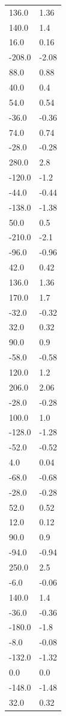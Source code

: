 \begin{longtable}{ll}
136.0 & 1.36 \\
140.0 & 1.4 \\
16.0 & 0.16 \\
-208.0 & -2.08 \\
88.0 & 0.88 \\
40.0 & 0.4 \\
54.0 & 0.54 \\
-36.0 & -0.36 \\
74.0 & 0.74 \\
-28.0 & -0.28 \\
280.0 & 2.8 \\
-120.0 & -1.2 \\
-44.0 & -0.44 \\
-138.0 & -1.38 \\
50.0 & 0.5 \\
-210.0 & -2.1 \\
-96.0 & -0.96 \\
42.0 & 0.42 \\
136.0 & 1.36 \\
170.0 & 1.7 \\
-32.0 & -0.32 \\
32.0 & 0.32 \\
90.0 & 0.9 \\
-58.0 & -0.58 \\
120.0 & 1.2 \\
206.0 & 2.06 \\
-28.0 & -0.28 \\
100.0 & 1.0 \\
-128.0 & -1.28 \\
-52.0 & -0.52 \\
4.0 & 0.04 \\
-68.0 & -0.68 \\
-28.0 & -0.28 \\
52.0 & 0.52 \\
12.0 & 0.12 \\
90.0 & 0.9 \\
-94.0 & -0.94 \\
250.0 & 2.5 \\
-6.0 & -0.06 \\
140.0 & 1.4 \\
-36.0 & -0.36 \\
-180.0 & -1.8 \\
-8.0 & -0.08 \\
-132.0 & -1.32 \\
0.0 & 0.0 \\
-148.0 & -1.48 \\
32.0 & 0.32 \\

\end{longtable}
